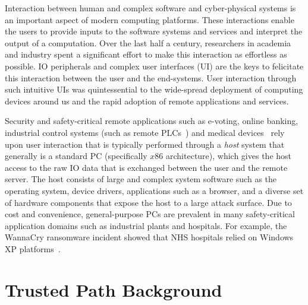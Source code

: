 Interaction between human and complex software and cyber-physical systems is an important aspect of modern computing platforms. These interactions enable the users to provide inputs to the software systems and services and interpret the output of a computation. Over the last half a century, researchers in academia and industry spent a significant effort to make this interaction as effortless as possible. IO peripherals and complex user interfaces (UI) are the keys to felicitate this interaction between the user and the end-systems. User interaction through such intuitive UIs was quintessential to the wide-spread deployment of computing devices around us and the rapid adoption of remote applications and services. 

Security and safety-critical remote applications such as e-voting, online banking, industrial control systems (such as remote PLCs~\cite{controlbyweb}) and medical devices~\cite{medicalDevice} rely upon user interaction that is typically performed through a \emph{host} system that generally is a standard PC (specifically $x86$ architecture), which gives the host access to the raw IO data that is exchanged between the user and the remote server. The host consists of large and complex system software such as the operating system, device drivers, applications such as a browser, and a diverse set of hardware components that expose the host to a large attack surface. Due to cost and convenience, general-purpose PCs are prevalent in many safety-critical application domains such as industrial plants and hospitals. For example, the WannaCry ransomware incident showed that NHS hospitals relied on Windows XP platforms~\cite{berry_2017,field_wannacry_2018}. 



\section{Trusted Path Background}

